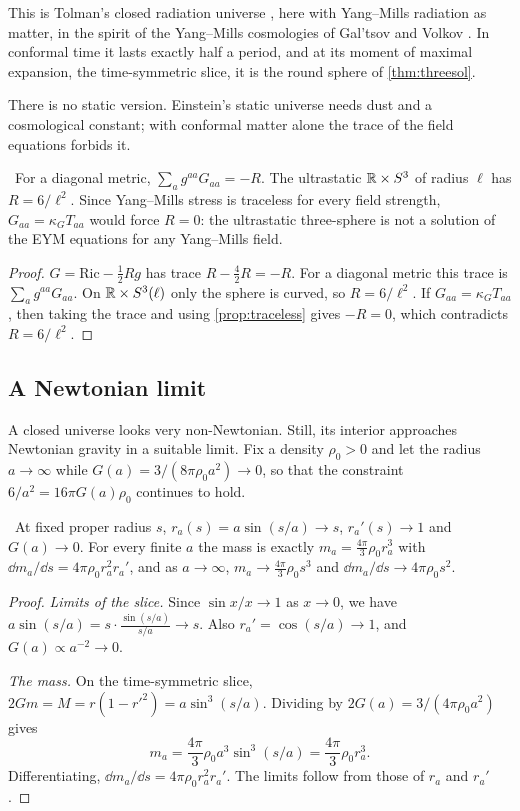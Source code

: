 This is Tolman's closed radiation universe \cite{Tolman1934}, here with Yang--Mills radiation as matter, in the spirit of the Yang--Mills cosmologies of Gal'tsov and Volkov \cite{GaltsovVolkov1991}. In conformal time it lasts exactly half a period, and at its moment of maximal expansion, the time-symmetric slice, it is the round sphere of \cref{thm:threesol}.

There is no static version. Einstein's static universe needs dust and a cosmological constant; with conformal matter alone the trace of the field equations forbids it.

\begin{proposition}\label{prop:nostatic}\ver\nogo\
For a diagonal metric, $\sum_ag^{aa}G_{aa}=-R$. The ultrastatic $\mathbb{R}\times S^3$ of radius $\ell$ has $R=6/\ell^2$. Since Yang--Mills stress is traceless for every field strength, $G_{aa}=\kappa_GT_{aa}$ would force $R=0$: the ultrastatic three-sphere is not a solution of the EYM equations for any Yang--Mills field.
\end{proposition}
\begin{proof}
$G=\mathrm{Ric}-\frac12Rg$ has trace $R-\frac42R=-R$. For a diagonal metric this trace is $\sum_ag^{aa}G_{aa}$. On $\mathbb{R}\times S^3(\ell)$ only the sphere is curved, so $R=6/\ell^2$. If $G_{aa}=\kappa_GT_{aa}$, then taking the trace and using \cref{prop:traceless} gives $-R=0$, which contradicts $R=6/\ell^2$.
\end{proof}


\subsection*{A Newtonian limit}

A closed universe looks very non-Newtonian. Still, its interior approaches Newtonian gravity in a suitable limit. Fix a density $\rho_0>0$ and let the radius $a\to\infty$ while $G(a)=3/(8\pi\rho_0a^2)\to0$, so that the constraint $6/a^2=16\pi G(a)\rho_0$ continues to hold.

\begin{proposition}[Newtonian limit]\label{prop:newtonlimit}\ver\
At fixed proper radius $s$, $r_a(s)=a\sin(s/a)\to s$, $r_a'(s)\to1$ and $G(a)\to0$. For every finite $a$ the mass is exactly $m_a=\frac{4\pi}3\rho_0r_a^3$ with $\dd m_a/\dd s=4\pi\rho_0r_a^2r_a'$, and as $a\to\infty$, $m_a\to\frac{4\pi}3\rho_0s^3$ and $\dd m_a/\dd s\to4\pi\rho_0s^2$.
\end{proposition}
\begin{proof}
\emph{Limits of the slice.} Since $\sin x/x\to1$ as $x\to0$, we have $a\sin(s/a)=s\cdot\frac{\sin(s/a)}{s/a}\to s$. Also $r_a'=\cos(s/a)\to1$, and $G(a)\propto a^{-2}\to0$.

\emph{The mass.} On the time-symmetric slice, $2Gm=M=r(1-r'^2)=a\sin^3(s/a)$. Dividing by $2G(a)=3/(4\pi\rho_0a^2)$ gives
\[
m_a=\frac{4\pi}3\rho_0a^3\sin^3(s/a)=\frac{4\pi}3\rho_0r_a^3 .
\]
Differentiating, $\dd m_a/\dd s=4\pi\rho_0r_a^2r_a'$. The limits follow from those of $r_a$ and $r_a'$.
\end{proof}


